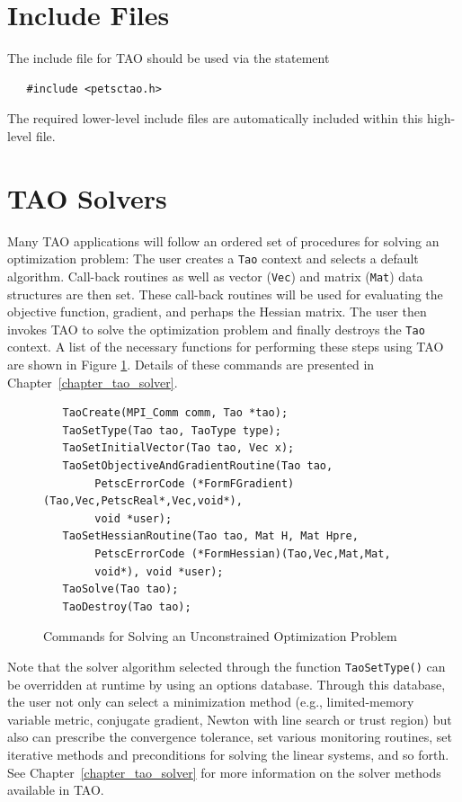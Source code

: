\documentclass[]{book}
\begin{document}
\section{Include Files}

The include file for TAO should be used via the statement
\begin{verbatim}
   #include <petsctao.h>
\end{verbatim}
\noindent
The required lower-level include files are automatically included
within this high-level file.

\section{TAO Solvers}

Many TAO applications will follow an ordered set of procedures for 
solving an optimization problem:
The user creates a \texttt{Tao} context and selects a default algorithm. 
Call-back routines as well as vector (\texttt{Vec}) and matrix (\texttt{Mat}) 
data structures are then set.  These call-back routines will be used for 
evaluating the objective function, gradient, and perhaps the Hessian 
matrix.  The user then invokes TAO to solve the optimization problem and 
finally destroys
the \texttt{Tao} context. A list of the necessary functions for 
performing these steps
using TAO are shown in Figure \ref{fig_tao_commands}.  Details of these commands are presented in
Chapter~\ref{chapter_tao_solver}.

\begin{figure}[H]
\begin{verbatim}
   TaoCreate(MPI_Comm comm, Tao *tao); 
   TaoSetType(Tao tao, TaoType type);
   TaoSetInitialVector(Tao tao, Vec x);
   TaoSetObjectiveAndGradientRoutine(Tao tao, 
        PetscErrorCode (*FormFGradient)(Tao,Vec,PetscReal*,Vec,void*), 
        void *user);
   TaoSetHessianRoutine(Tao tao, Mat H, Mat Hpre,
        PetscErrorCode (*FormHessian)(Tao,Vec,Mat,Mat,
        void*), void *user);
   TaoSolve(Tao tao);
   TaoDestroy(Tao tao);
\end{verbatim}
\caption{Commands for Solving an Unconstrained Optimization Problem
\label{fig_tao_commands}}
\end{figure}

Note that the solver algorithm selected through the function 
\texttt{TaoSetType()} can be overridden
at runtime by using an options database.  Through this
database, the user not only can select a minimization method (e.g.,
limited-memory variable metric, conjugate gradient, Newton with line
search or trust region) but also can prescribe the convergence
tolerance, set various monitoring routines, set iterative methods
and preconditions for solving the linear systems, and so forth.  See 
Chapter~\ref{chapter_tao_solver} for more information on the 
solver methods available in TAO.
\end{document}
